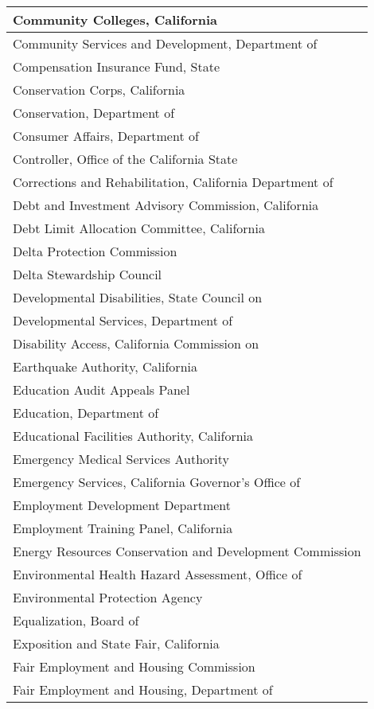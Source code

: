 \documentclass[
]{article}
\begin{document}
\begin{table}
\begin{tabular}[t]{l}
Community Colleges, California\\
\hline
Community Services and Development, Department of\\
\hline
Compensation Insurance Fund, State\\
\hline
Conservation Corps, California\\
\hline
Conservation, Department of\\
\hline
Consumer Affairs, Department of\\
\hline
Controller, Office of the California State\\
\hline
Corrections and Rehabilitation, California Department of\\
\hline
Debt and Investment Advisory Commission, California\\
\hline
Debt Limit Allocation Committee, California\\
\hline
Delta Protection Commission\\
\hline
Delta Stewardship Council\\
\hline
Developmental Disabilities, State Council on\\
\hline
Developmental Services, Department of\\
\hline
Disability Access, California Commission on\\
\hline
Earthquake Authority, California\\
\hline
Education Audit Appeals Panel\\
\hline
Education, Department of\\
\hline
Educational Facilities Authority, California\\
\hline
Emergency Medical Services Authority\\
\hline
Emergency Services, California Governor's Office of\\
\hline
Employment Development Department\\
\hline
Employment Training Panel, California\\
\hline
Energy Resources Conservation and Development Commission\\
\hline
Environmental Health Hazard Assessment, Office of\\
\hline
Environmental Protection Agency\\
\hline
Equalization, Board of\\
\hline
Exposition and State Fair, California\\
\hline
Fair Employment and Housing Commission\\
\hline
Fair Employment and Housing, Department of\\

\end{tabular}
\end{table}
\end{document}
